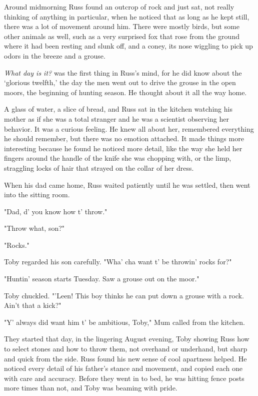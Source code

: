 Around midmorning Russ found an outcrop of rock and just sat, not really thinking of anything in particular, when he noticed that as long as he kept still, there was a lot of movement around him. There were mostly birds, but some other animals as well, such as a very surprised fox that rose from the ground where it had been resting and slunk off, and a coney, its nose wiggling to pick up odors in the breeze and{\el} a grouse.

\emph{What day is it?} was the first thing in Russ's mind, for he did know about the `glorious twelfth,' the day the men went out to drive the grouse in the open moors, the beginning of hunting season. He thought about it all the way home.

A glass of water, a slice of bread, and Russ sat in the kitchen watching his mother as if she was a total stranger and he was a scientist observing her behavior. It was a curious feeling. He knew all about her, remembered everything he should remember, but there was no emotion attached. It made things more interesting because he found he noticed more detail, like the way she held her fingers around the handle of the knife she was chopping with, or the limp, straggling locks of hair that strayed on the collar of her dress.

When his dad came home, Russ waited patiently until he was settled, then went into the sitting room.

"Dad, d' you know how t' throw."

"Throw what, son?"

"Rocks."

Toby regarded his son carefully. "Wha' cha want t' be throwin' rocks for?"

"Huntin' season starts Tuesday. Saw a grouse out on the moor."

Toby chuckled. "'Leen! This boy thinks he can put down a grouse with a rock. Ain't that a kick?"

"Y' always did want him t' be ambitious, Toby," Mum called from the kitchen.

They started that day, in the lingering August evening, Toby showing Russ how to select stones and how to throw them, not overhand or underhand, but sharp and quick from the side. Russ found his new sense of cool apartness helped. He noticed every detail of his father's stance and movement, and copied each one with care and accuracy. Before they went in to bed, he was hitting fence posts more times than not, and Toby was beaming with pride.


